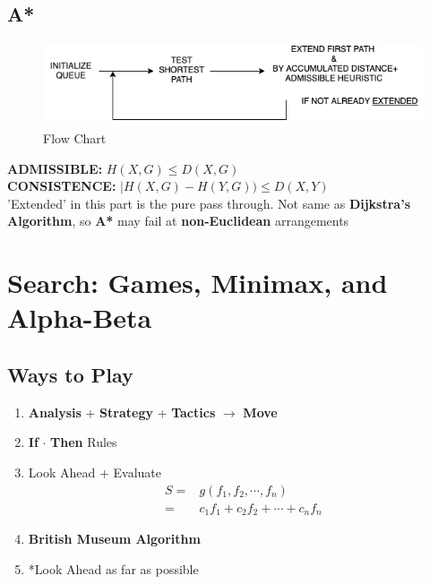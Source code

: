 \documentclass[12pt]{book}
\begin{document}
\subsection{A*}
\begin{figure}[ht]
	\centering
	\includegraphics[scale=1]{Figure/Figure5_5.png}
	\caption{Flow Chart}
\end{figure}
\indent\textbf{ADMISSIBLE:} $H(X, G) \leq D(X, G)$\\
\indent\textbf{CONSISTENCE:} $|H(X, G)-H(Y,G)) \leq D(X, Y)$\\
\indent 'Extended' in this part is the pure pass through. Not same as \textbf{Dijkstra’s Algorithm}, so \textbf{A*} may fail at \textbf{non-Euclidean} arrangements
\newpage

\section{Search: Games, Minimax, and Alpha-Beta}
\subsection{Ways to Play}
\begin{enumerate}
	\item \textbf{Analysis} + \textbf{Strategy} + \textbf{Tactics} $\rightarrow$ \textbf{Move}
	\item \textbf{If} $\cdot$ \textbf{Then} Rules
	\item Look Ahead + Evaluate
	\begin{equation*}
	\begin{aligned}
	S=&g(f_1, f_2, \cdots, f_n)\\
	=&c_1f_1+c_2f_2+\cdots+c_nf_n
	\end{aligned}
	\end{equation*}
	\item \textbf{British Museum Algorithm}
	\item *Look Ahead as far as possible 
\end{enumerate}
\end{document}
